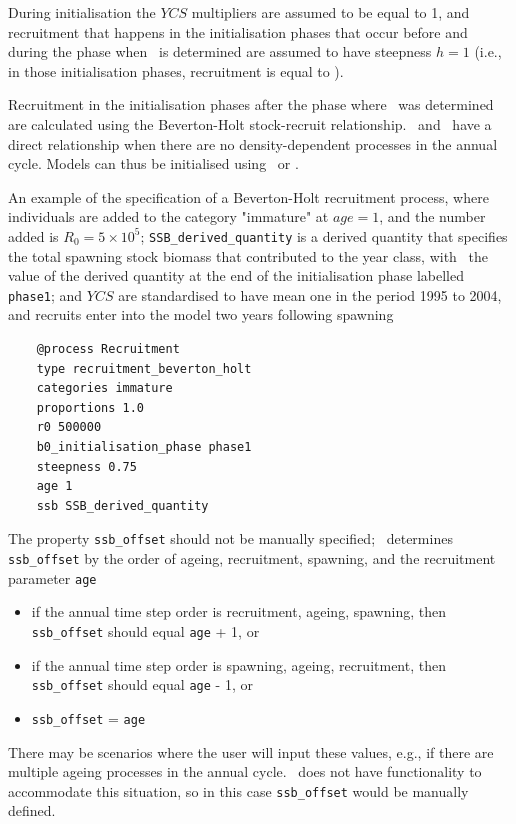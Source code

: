 During initialisation the $YCS$ multipliers are assumed to be equal to 1, and recruitment that happens in the initialisation phases that occur before and during the phase when \Bzero\ is determined are assumed to have steepness $h=1$ (i.e., in those initialisation phases, recruitment is equal to \Rzero).

Recruitment in the initialisation phases after the phase where \Bzero\ was determined are calculated using the Beverton-Holt stock-recruit relationship. \Rzero\ and \Bzero\ have a direct relationship when there are no density-dependent processes in the annual cycle. Models can thus be initialised using \Bzero\ or \Rzero.

An example of the specification of a Beverton-Holt recruitment process, where individuals are added to the category "immature" at $age=1$, and the number added is $R_0=5 \times 10^5$; \texttt{SSB\_derived\_quantity} is a derived quantity that specifies the total spawning stock biomass that contributed to the year class, with \Bzero\ the value of the derived quantity at the end of the initialisation phase labelled \texttt{phase1}; and $YCS$ are standardised to have mean one in the period 1995 to 2004, and recruits enter into the model two years following spawning

{\small{\begin{verbatim}
	@process Recruitment
	type recruitment_beverton_holt
	categories immature
	proportions 1.0
	r0 500000
	b0_initialisation_phase phase1
	steepness 0.75
	age 1
	ssb SSB_derived_quantity

\end{verbatim}}}

The property \texttt{ssb\_offset} should not be manually specified; \CNAME\ determines \texttt{ssb\_offset} by the order of ageing, recruitment, spawning, and the recruitment parameter \texttt{age}

\begin{itemize}
	\item if the annual time step order is recruitment, ageing, spawning, then \texttt{ssb\_offset} should equal \texttt{age} + 1, or
	\item if the annual time step order is spawning, ageing, recruitment, then \texttt{ssb\_offset} should equal \texttt{age} - 1, or
	\item \texttt{ssb\_offset} = \texttt{age}
\end{itemize}

There may be scenarios where the user will input these values, e.g., if there are multiple ageing processes in the annual cycle. \CNAME\ does not have functionality to accommodate this situation, so in this case \texttt{ssb\_offset} would be manually defined.

